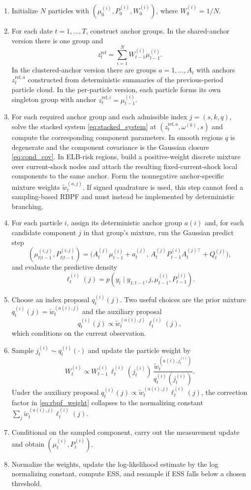 \documentclass[11pt]{article}
\theoremstyle{remark}
\begin{document}
\begin{enumerate}[leftmargin=*, itemsep=3pt]
\item Initialize $N$ particles with $(\mu_0^{(i)},P_0^{(i)},W_0^{(i)})$, where $W_0^{(i)}=1/N$.
\item For each date $t=1,\ldots,T$, construct anchor groups.
In the shared-anchor version there is one group and
\[
z_t^{\mathrm{ref}}=\sum_{i=1}^N W_{t-1}^{(i)}\mu_{t-1}^{(i)}.
\]
In the clustered-anchor version there are groups $a=1,\ldots,A_t$ with anchors $z_t^{\mathrm{ref},a}$ constructed from deterministic summaries of the previous-period particle cloud.
In the per-particle version, each particle forms its own singleton group with anchor $z_t^{\mathrm{ref},i}=\mu_{t-1}^{(i)}$.
\item For each required anchor group and each admissible index $j=(s,k,q)$, solve the stacked system \eqref{eq:stacked_system} at $(z_t^{\mathrm{ref},a},\omega^{(k)},s)$ and compute the corresponding component parameters.
In smooth regions $q$ is degenerate and the component covariance is the Gaussian closure \eqref{eq:cond_cov}.
In ELB-risk regions, build a positive-weight discrete mixture over current-shock nodes and attach the resulting fixed-current-shock local components to the same anchor.
Form the nonnegative anchor-specific mixture weights $\tilde w_t^{(a,j)}$.
If signed quadrature is used, this step cannot feed a sampling-based RBPF and must instead be implemented by deterministic branching.
\item For each particle $i$, assign its deterministic anchor group $a(i)$ and, for each candidate component $j$ in that group's mixture, run the Gaussian predict step
\[
(\mu_{t|t-1}^{(i,j)},P_{t|t-1}^{(i,j)})
=
\big(A_t^{(j)}\mu_{t-1}^{(i)}+a_t^{(j)},\,
A_t^{(j)}P_{t-1}^{(i)}A_t^{(j)\top}+Q_t^{(j)}\big),
\]
and evaluate the predictive density
\[
\ell_t^{(i)}(j)=p(y_t\mid y_{1:t-1},j,\mu_{t-1}^{(i)},P_{t-1}^{(i)}).
\]
\item Choose an index proposal $q_t^{(i)}(j)$.
Two useful choices are the prior mixture $q_t^{(i)}(j)=\tilde w_t^{(a(i),j)}$ and the auxiliary proposal
\[
q_t^{(i)}(j)\propto \tilde w_t^{(a(i),j)}\,\ell_t^{(i)}(j),
\]
which conditions on the current observation.
\item Sample $j_t^{(i)}\sim q_t^{(i)}(\cdot)$ and update the particle weight by
\begin{equation}
W_t^{(i)}
\propto
W_{t-1}^{(i)}\,
\ell_t^{(i)}(j_t^{(i)})\,
\frac{\tilde w_t^{(a(i),j_t^{(i)})}}{q_t^{(i)}(j_t^{(i)})}.
\label{eq:rbpf_weight}
\end{equation}
Under the auxiliary proposal $q_t^{(i)}(j)\propto \tilde w_t^{(a(i),j)}\ell_t^{(i)}(j)$, the correction factor in \eqref{eq:rbpf_weight} collapses to the normalizing constant $\sum_j \tilde w_t^{(a(i),j)}\ell_t^{(i)}(j)$.
\item Conditional on the sampled component, carry out the measurement update and obtain $(\mu_t^{(i)},P_t^{(i)})$.
\item Normalize the weights, update the log-likelihood estimate by the log normalizing constant, compute ESS, and resample if ESS falls below a chosen threshold.
\end{enumerate}
\end{document}
